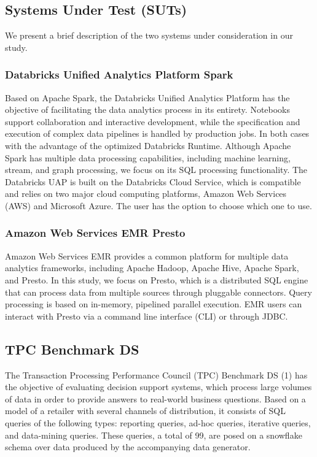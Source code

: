 \subsection{Systems Under Test (SUTs)}
We present a brief description of the two systems under consideration in our study.

\subsubsection{Databricks Unified Analytics Platform Spark}
Based on Apache Spark, the Databricks Unified Analytics Platform has the objective of facilitating the data analytics process in its entirety. Notebooks support collaboration and interactive development, while the specification and execution of complex data pipelines is handled by production jobs. In both cases with the advantage of the optimized Databricks Runtime. Although Apache Spark has multiple data processing capabilities, including machine learning, stream, and graph processing, we focus on its SQL processing functionality. The Databricks UAP is built on the Databricks Cloud Service, which is compatible and relies on two major cloud computing platforms, Amazon Web Services (AWS) and Microsoft Azure. The user has the option to choose which one to use.

\subsubsection{Amazon Web Services EMR Presto}
Amazon Web Services EMR provides a common platform for multiple data analytics frameworks, including Apache Hadoop, Apache Hive, Apache Spark, and Presto. In this study, we focus on Presto, which is a distributed SQL engine that can process data from multiple sources through pluggable connectors. Query processing is based on in-memory, pipelined parallel execution. EMR users can interact with Presto via a command line interface (CLI) or through JDBC.

\subsection{TPC Benchmark DS}
The Transaction Processing Performance Council (TPC) Benchmark DS (1) has the objective of evaluating decision support systems, which process large volumes of data in order to provide answers to real-world business questions. Based on a model of a retailer with several channels of distribution, it consists of SQL queries of the following types: reporting queries, ad-hoc queries, iterative queries, and data-mining queries. These queries, a total of 99, are posed on a snowflake schema over data produced by the accompanying data generator.

